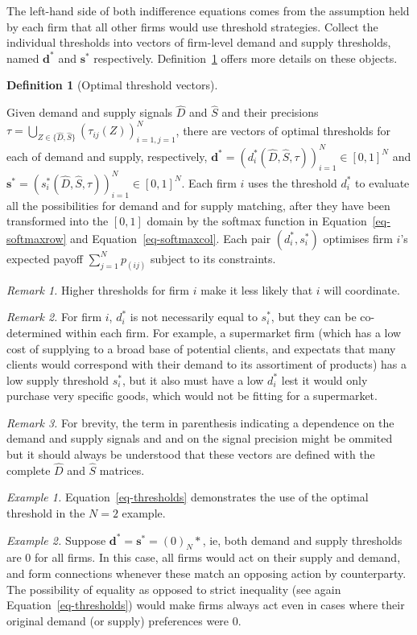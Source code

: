 \documentclass[
]{article}
\theoremstyle{definition}
\newtheorem{definition}{Definition}[section]
\theoremstyle{plain}
\theoremstyle{remark}
\begin{document}
The left-hand side of both indifference equations comes from the
assumption held by each firm that all other firms would use threshold
strategies. Collect the individual thresholds into vectors of firm-level
demand and supply thresholds, named \(\mathbf{d}^*\) and
\(\mathbf{s}^*\) respectively. Definition~\ref{def-optmthresh} offers
more details on these objects.

\begin{definition}[Optimal threshold
vectors]\protect\hypertarget{def-optmthresh}{}\label{def-optmthresh}

Given demand and supply signals \(\hat{D}\) and \(\hat{S}\) and their
precisions
\(\tau = \bigcup_{Z \in \{\hat{D}, \hat{S}\}} (\tau_{ij}(Z))_{i=1, j=1}^N\),
there are vectors of optimal thresholds for each of demand and supply,
respectively,
\(\mathbf{d}^* = (d_i^*(\hat{D}, \hat{S}, \tau))_{i=1}^N \in [0, 1]^N\)
and
\(\mathbf{s}^* = (s_i^*(\hat{D}, \hat{S}, \tau))_{i=1}^N \in [0, 1]^N\).
Each firm \(i\) uses the threshold \(d_i^*\) to evaluate all the
possibilities for demand and for supply matching, after they have been
transformed into the \([0, 1]\) domain by the softmax function in
Equation~\ref{eq-softmaxrow} and Equation~\ref{eq-softmaxcol}. Each pair
\((d_i^*, s_i^*)\) optimises firm \(i\)'s expected payoff
\(\sum_{j=1}^N p_(ij)\) subject to its constraints.

\emph{Remark 1.} Higher thresholds for firm \(i\) make it less likely
that \(i\) will coordinate.

\emph{Remark 2.} For firm \(i\), \(d_i^*\) is not necessarily equal to
\(s_i^*\), but they can be co-determined within each firm. For example,
a supermarket firm (which has a low cost of supplying to a broad base of
potential clients, and expectats that many clients would correspond with
their demand to its assortiment of products) has a low supply threshold
\(s_i^*\), but it also must have a low \(d_i^*\) lest it would only
purchase very specific goods, which would not be fitting for a
supermarket.

\emph{Remark 3.} For brevity, the term in parenthesis indicating a
dependence on the demand and supply signals and and on the signal
precision might be ommited but it should always be understood that these
vectors are defined with the complete \(\hat{D}\) and \(\hat{S}\)
matrices.

\emph{Example 1.} Equation~\ref{eq-thresholds} demonstrates the use of
the optimal threshold in the \(N=2\) example.

\emph{Example 2.} Suppose
\(\mathbf{d}^{*} = \mathbf{s}^{*} = (0)_{N}*\), ie, both demand and
supply thresholds are 0 for all firms. In this case, all firms would act
on their supply and demand, and form connections whenever these match an
opposing action by counterparty. The possibility of equality as opposed
to strict inequality (see again Equation~\ref{eq-thresholds}) would make
firms always act even in cases where their original demand (or supply)
preferences were \(0\).


\end{definition}
\end{document}
